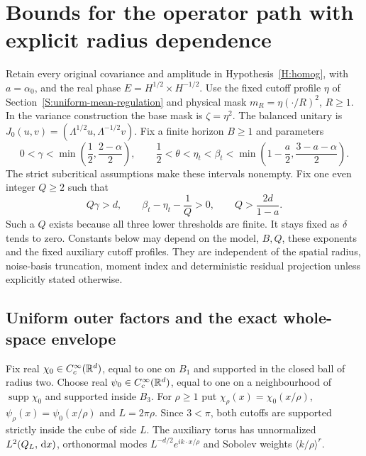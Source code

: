\section{Bounds for the operator path with explicit radius dependence}
\label{S:radius-stochastic-anchor}

Retain every original covariance and amplitude in Hypothesis~\ref{H:homog}, with
$a = \alpha_0$, and the real phase $E = H^{1/2}\times H^{-1/2}$. Use the fixed
cutoff profile $\eta$ of Section~\ref{S:uniform-mean-regulation} and physical
mask $m_R = \eta(\cdot/R)^2$, $R \ge 1$. In the variance construction the base
mask is $\zeta = \eta^2$. The balanced unitary is $J_0(u,v) =
(\Lambda^{1/2}u,\Lambda^{-1/2}v)$. Fix a finite horizon $B \ge 1$ and parameters
\begin{equation}\label{E:radius-anchor-parameters}
  0<\gamma<\min\left(\frac12,\frac{2-\alpha}{2}\right),\qquad
  \frac12<\theta<\eta_t<\beta_t<
  \min\left(1-\frac a2,\frac{3-a-\alpha}{2}\right).
\end{equation}
The strict subcritical assumptions make these intervals nonempty. Fix one even
integer $Q \ge 2$ such that
\begin{equation}\label{E:radius-anchor-Q}
  Q\gamma>d,\qquad
  \beta_t-\eta_t-\frac1Q>0,\qquad
  Q>\frac{2d}{1-a}.
\end{equation}
Such a $Q$ exists because all three lower thresholds are finite. It stays fixed
as $\delta$ tends to zero. Constants below may depend on the model, $B,Q$, these
exponents and the fixed auxiliary cutoff profiles. They are independent of the
spatial radius, noise-basis truncation, moment index and deterministic residual
projection unless explicitly stated otherwise.

\subsection{Uniform outer factors and the exact whole-space envelope}

Fix real $\chi_0 \in C_c^\infty(\mathbb{R}^d)$, equal to one on $B_1$ and supported in
the closed ball of radius two. Choose real $\psi_0 \in C_c^\infty(\mathbb{R}^d)$, equal
to one on a neighbourhood of $\operatorname{supp}\chi_0$ and supported inside
$B_3$. For $\rho \ge 1$ put $\chi_\rho(x) = \chi_0(x/\rho)$, $\psi_\rho(x) =
\psi_0(x/\rho)$ and $L = 2\pi\rho$. Since $3 < \pi$, both cutoffs are supported
strictly inside the cube of side $L$. The auxiliary torus has unnormalized
$L^2(Q_L,\,\mathrm{d} x)$, orthonormal modes $L^{-d/2}e^{ik\cdot x/\rho}$ and Sobolev
weights $\langle k/\rho\rangle^r$.

